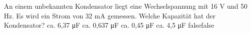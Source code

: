     {An einem unbekannten Kondensator liegt eine Wechselspannung mit 16 V und 50 Hz. Es wird ein Strom von 32 mA gemessen. Welche Kapazität hat der Kondensator?}
    {ca. 6,37 μF}
    {ca. 0,637 μF}
    {ca. 0,45 μF}
    {ca. 4,5 μF}
    {false}{false}